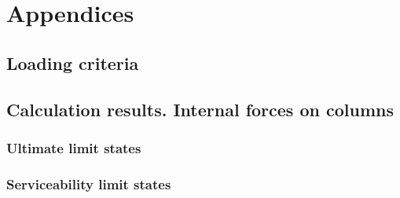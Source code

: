 \newpage
\appendix
\section*{Appendices}
\renewcommand{\thesubsection}{\Alph{subsection}}

\subsection{Loading criteria} \label{loadCrit}


\newpage
\subsection{Calculation results. Internal forces on columns}\label{sc_column_internal_forces}
\subsubsection{Ultimate limit states}

\clearpage
\newpage
\subsubsection{Serviceability limit states}


